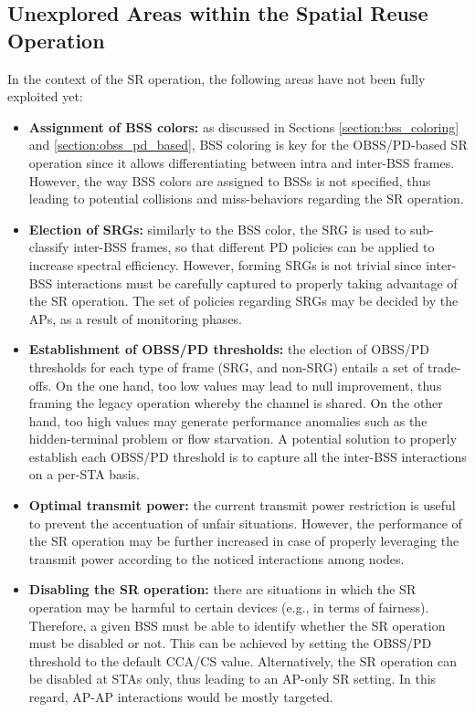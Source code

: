 \documentclass{article}
\begin{document}
\subsection{Unexplored Areas within the Spatial Reuse Operation}
In the context of the SR operation, the following areas have not been fully exploited yet:
\begin{itemize}
	\item \textbf{Assignment of BSS colors:} as discussed in Sections \ref{section:bss_coloring} and \ref{section:obss_pd_based}, BSS coloring is key for the OBSS/PD-based SR operation since it allows differentiating between intra and inter-BSS frames. However, the way BSS colors are assigned to BSSs is not specified, thus leading to potential collisions and miss-behaviors regarding the SR operation.
	\item \textbf{Election of SRGs:} similarly to the BSS color, the SRG is used to sub-classify inter-BSS frames, so that different PD policies can be applied to increase spectral efficiency. However, forming SRGs is not trivial since inter-BSS interactions must be carefully captured to properly taking advantage of the SR operation. The set of policies regarding SRGs may be decided by the APs, as a result of monitoring phases.%
	\item \textbf{Establishment of OBSS/PD thresholds:} the election of OBSS/PD thresholds for each type of frame (SRG, and non-SRG) entails a set of trade-offs. On the one hand, too low values may lead to null improvement, thus framing the legacy operation whereby the channel is shared. On the other hand, too high values may generate performance anomalies such as the hidden-terminal problem or flow starvation. A potential solution to properly establish each OBSS/PD threshold is to capture all the inter-BSS interactions on a per-STA basis.
	\item \textbf{Optimal transmit power:} the current transmit power restriction is useful to prevent the accentuation of unfair situations. However, the performance of the SR operation may be further increased in case of properly leveraging the transmit power according to the noticed interactions among nodes.
	\item \textbf{Disabling the SR operation:} there are situations in which the SR operation may be harmful to certain devices (e.g., in terms of fairness). Therefore, a given BSS must be able to identify whether the SR operation must be disabled or not. This can be achieved by setting the OBSS/PD threshold to the default CCA/CS value. Alternatively, the SR operation can be disabled at STAs only, thus leading to an AP-only SR setting. In this regard, AP-AP interactions would be mostly targeted.
\end{itemize}
\end{document}
